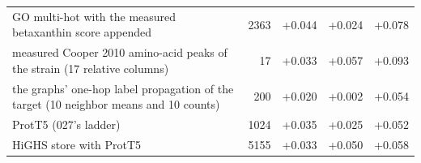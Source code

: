 \begin{table}[H]
\begin{tabular}{@{}lrrrr@{}}
    GO multi-hot with the measured betaxanthin score appended & 2363 & +0.044 & +0.024 & +0.078 \\
    measured Cooper 2010 amino-acid peaks of the strain (17 relative columns) & 17 & +0.033 & +0.057 & +0.093 \\
    the graphs' one-hop label propagation of the target (10 neighbor means and 10 counts) & 200 & +0.020 & +0.002 & +0.054 \\
    ProtT5 (027's ladder) & 1024 & +0.035 & +0.025 & +0.052 \\
    HiGHS store with ProtT5 & 5155 & +0.033 & +0.050 & +0.058 \\
    \hline
  \end{tabular}
\end{table}
